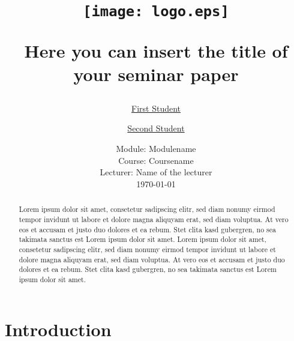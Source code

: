 \documentclass[a4paper]{article}
\begin{document}
	\title{
	\begin{figure}[!ht]
		\flushleft
			\texttt{[image: logo.eps]}
	\end{figure}
	\vspace{1cm}
	\Huge Here you can insert the title of \\ your seminar paper \\
	}
	
	\vspace{1cm}
	
	
	\author{\Large \href{mailto:first.student@smail.fh-koeln.de}{First Student} \and \Large \href{mailto:second.student@smail.fh-koeln.de}{Second Student}
	\vspace{1cm}}
	
	\date{
	\large Module: Modulename \\ Course: Coursename \\ 
	\vspace{0.8cm}
	\large Lecturer: Name of the lecturer \\
	\vspace{1cm}
	\today
	}

	\maketitle
	\setlength{\parindent}{0pt}

\vspace{2cm}
\begin{abstract}
Lorem ipsum dolor sit amet, consetetur sadipscing elitr, sed diam nonumy eirmod tempor invidunt ut labore et dolore magna aliquyam erat, sed diam voluptua. At vero eos et accusam et justo duo dolores et ea rebum. Stet clita kasd gubergren, no sea takimata sanctus est Lorem ipsum dolor sit amet. Lorem ipsum dolor sit amet, consetetur sadipscing elitr, sed diam nonumy eirmod tempor invidunt ut labore et dolore magna aliquyam erat, sed diam voluptua. At vero eos et accusam et justo duo dolores et ea rebum. Stet clita kasd gubergren, no sea takimata sanctus est Lorem ipsum dolor sit amet.

\end{abstract}
	\newpage
	\tableofcontents
	\newpage
	
\section{Introduction} %
\label{sec:introduction}
\end{document}
